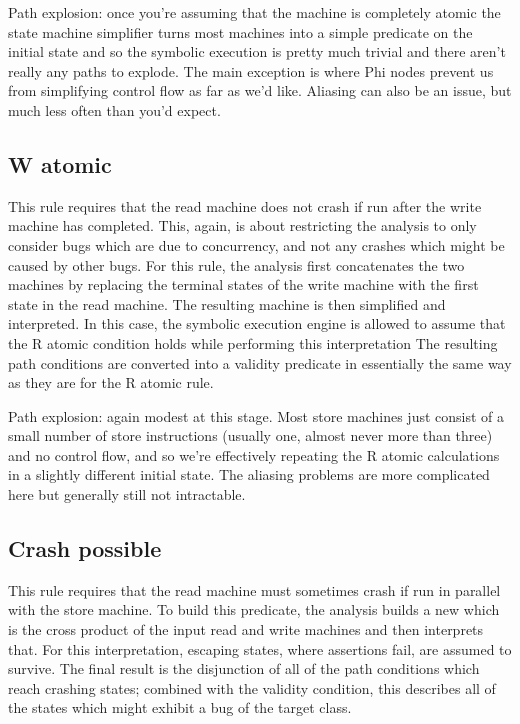 Path explosion: once you're assuming that the machine is completely atomic the state machine simplifier turns most machines into a simple predicate on the initial state and so the symbolic execution is pretty much trivial and there aren't really any paths to explode.
The main exception is where Phi nodes prevent us from simplifying control flow as far as we'd like.
Aliasing can also be an issue, but much less often than you'd expect.

\subsection{W atomic}

This rule requires that the read machine does not crash if run after the write machine has completed.
This, again, is about restricting the analysis to only consider bugs which are due to concurrency, and not any crashes which might be caused by other bugs.
For this rule, the analysis first concatenates the two machines by replacing the terminal states of the write machine with the first state in the read machine.
The resulting machine is then simplified and interpreted.
In this case, the symbolic execution engine is allowed to assume that the R atomic condition holds while performing this interpretation
The resulting path conditions are converted into a validity predicate in essentially the same way as they are for the R atomic rule.

Path explosion: again modest at this stage.
Most store machines just consist of a small number of store instructions (usually one, almost never more than three) and no control flow, and so we're effectively repeating the R atomic calculations in a slightly different initial state.
The aliasing problems are more complicated here but generally still not intractable.

\subsection{Crash possible}

This rule requires that the read machine must sometimes crash if run in parallel with the store machine.
To build this predicate, the analysis builds a new \StateMachine which is the cross product of the input read and write machines and then interprets that.
For this interpretation, escaping states, where assertions fail, are assumed to survive.
The final result is the disjunction of all of the path conditions which reach crashing states; combined with the validity condition, this describes all of the states which might exhibit a bug of the target class.

